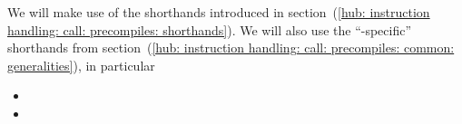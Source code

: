 We will make use of the shorthands introduced in
section~(\ref{hub: instruction handling: call: precompiles: shorthands}).
We will also use the ``\instEcrecover{}-specific'' shorthands from
section~(\ref{hub: instruction handling: call: precompiles: common: generalities}),
in particular
\begin{itemize}
	\item \locAddressRecoveryFailure{}
	\item \locAddressRecoverySuccess{}
\end{itemize}
